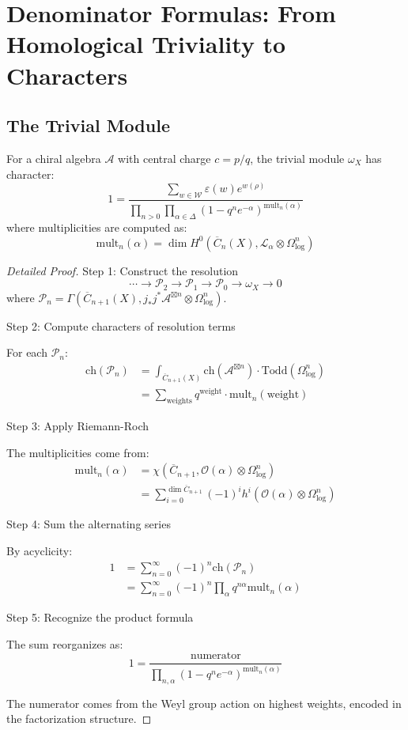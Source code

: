 \section{Denominator Formulas: From Homological Triviality to Characters}

\subsection{The Trivial Module}

\begin{theorem}
For a chiral algebra $\mathcal{A}$ with central charge $c = p/q$, the trivial module $\omega_X$ has character:
\[
1 = \frac{\sum_{w \in \mathcal{W}} \varepsilon(w) e^{w(\rho)}}{\prod_{n > 0} \prod_{\alpha \in \Delta} (1 - q^n e^{-\alpha})^{\text{mult}_n(\alpha)}}
\]
where multiplicities are computed as:
\[
\text{mult}_n(\alpha) = \dim H^0(\overline{C}_n(X), \mathcal{L}_\alpha \otimes \Omega^n_{\log})
\]
\end{theorem}

\begin{proof}[Detailed Proof]
Step 1: Construct the resolution
\[
\cdots \to \mathcal{P}_2 \to \mathcal{P}_1 \to \mathcal{P}_0 \to \omega_X \to 0
\]
where $\mathcal{P}_n = \Gamma(\overline{C}_{n+1}(X), j_*j^*\mathcal{A}^{\boxtimes n} \otimes \Omega^n_{\log})$.

Step 2: Compute characters of resolution terms

For each $\mathcal{P}_n$:
\begin{align}
\text{ch}(\mathcal{P}_n) &= \int_{\overline{C}_{n+1}(X)} \text{ch}(\mathcal{A}^{\boxtimes n}) \cdot \text{Todd}(\Omega^n_{\log}) \\
&= \sum_{\text{weights}} q^{\text{weight}} \cdot \text{mult}_n(\text{weight})
\end{align}

Step 3: Apply Riemann-Roch

The multiplicities come from:
\begin{align}
\text{mult}_n(\alpha) &= \chi(\overline{C}_{n+1}, \mathcal{O}(\alpha) \otimes \Omega^n_{\log}) \\
&= \sum_{i=0}^{\dim \overline{C}_{n+1}} (-1)^i h^i(\mathcal{O}(\alpha) \otimes \Omega^n_{\log})
\end{align}

Step 4: Sum the alternating series

By acyclicity:
\begin{align}
1 &= \sum_{n=0}^\infty (-1)^n \text{ch}(\mathcal{P}_n) \\
&= \sum_{n=0}^\infty (-1)^n \prod_{\alpha} q^{n\alpha} \text{mult}_n(\alpha)
\end{align}

Step 5: Recognize the product formula

The sum reorganizes as:
\[
1 = \frac{\text{numerator}}{\prod_{n,\alpha} (1 - q^n e^{-\alpha})^{\text{mult}_n(\alpha)}}
\]

The numerator comes from the Weyl group action on highest weights, encoded in the factorization structure.
\end{proof}

